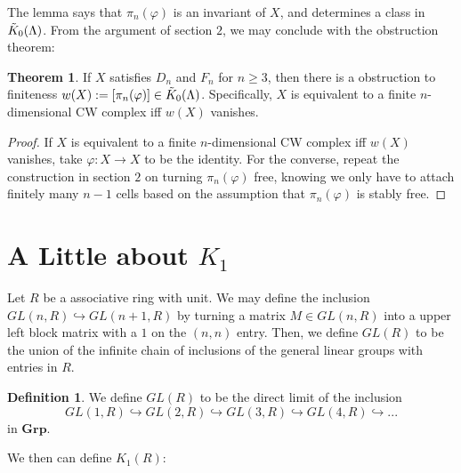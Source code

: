 \documentclass{article}
\theoremstyle{definition}
\newtheorem{theorem}{Theorem}[section]
\theoremstyle{definition}
\newtheorem{definition}{Definition}[theorem]
\theoremstyle{definition}
\theoremstyle{definition}
\theoremstyle{definition}
\theoremstyle{definition}
\theoremstyle{definition}
\begin{document}
The lemma says that $\pi_n(\varphi)$ is an invariant of $X$, and determines a class in $\Tilde{K}_0(\Lambda)$. From the argument of section $2$, we may conclude with the obstruction theorem:
\begin{tcolorbox}[colback=red!5!white,colframe=red!30!white]
\begin{theorem}
If $X$ satisfies $D_n$ and $F_n$ for $n\geq 3$, then there is a obstruction to finiteness $w(X):=[\pi_n(\varphi)]\in \Tilde{K}_0(\Lambda)$. Specifically, $X$ is equivalent to a finite $n$-dimensional CW complex iff $w(X)$ vanishes.  
\end{theorem}
\end{tcolorbox}
\begin{proof}
  If $X$ is equivalent to a finite $n$-dimensional CW complex iff $w(X)$ vanishes, take $\varphi: X\to X$ to be the identity. For the converse, repeat the construction in section $2$ on turning $\pi_n(\varphi)$ free, knowing we only have to attach finitely many $n-1$ cells based on the assumption that $\pi_n(\varphi)$ is stably free. 
\end{proof}















\section{A Little about $K_1$}
Let $R$ be a associative ring with unit. We may define the inclusion $GL(n,R)\hookrightarrow GL(n+1,R)$ by turning a matrix $M\in GL(n,R)$ into a upper left block matrix with a $1$ on the $(n,n)$ entry. Then, we define $GL(R)$ to be the union of the infinite chain of inclusions of the general linear groups with entries in $R$.

\begin{tcolorbox}[colback=purple!5!white,colframe=purple!75!black]
\begin{definition}
    We define $GL(R)$ to be the direct limit of the inclusion
    \[
GL(1,R)\hookrightarrow GL(2,R)\hookrightarrow GL(3,R)\hookrightarrow GL(4,R)\hookrightarrow ...
\] in $\textbf{Grp}$.
\end{definition}
\end{tcolorbox}

We then can define $K_1(R)$:
\end{document}
